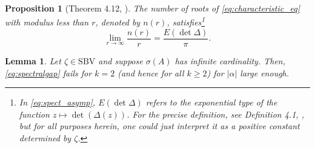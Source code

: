 \documentclass[a4paper, 12pt, oneside, reqno, notitlepage]{amsart}
\theoremstyle{plain}
\newtheorem{lemma}[theorem]{Lemma}
\newtheorem{proposition}[theorem]{Proposition}
\theoremstyle{definition}
\theoremstyle{remark}
\newcommand{\sbv}{\mathrm{SBV}}
\begin{document}
\begin{proposition}[Theorem 4.12, \cite{lunel1989exponential}] \label{prop:spectrum2}
    The number of roots of \eqref{eq:characteristic_eq} with modulus less than $r$, denoted by $n(r)$, satisfies\footnote{
    In \eqref{eq:spect_asymp}, $E(\det \Delta)$ refers to the exponential type of the function $z \mapsto \det (\Delta(z))$. 
    For the precise definition, see Definition 4.1, \cite{lunel1989exponential}, but for all  purposes herein, one could just interpret it as a positive constant determined by $\zeta$.
    }
    \begin{equation}
        \lim_{r \to \infty} \frac{n(r)}{r} = \frac{E(\det \Delta)}{\pi}.
        \label{eq:spect_asymp}
    \end{equation}
\end{proposition}



\begin{lemma}
    Let $\zeta \in \sbv$ and suppose $\sigma(A)$ has infinite cardinality.
    Then, \eqref{eq:spectralgap}  fails for $k = 2$ (and hence for all $k \geq 2$) for $|\alpha|$ large enough.
\end{lemma}
\end{document}
